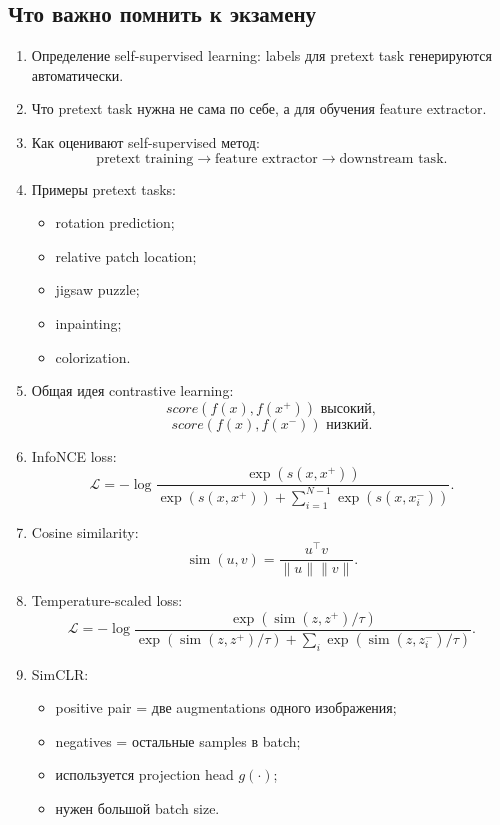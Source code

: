 \documentclass[a4paper,12pt]{article}
\begin{document}
\subsection{Что важно помнить к экзамену}

\begin{enumerate}
    \item Определение self-supervised learning:
    labels для pretext task генерируются автоматически.

    \item Что pretext task нужна не сама по себе, а для обучения feature extractor.

    \item Как оценивают self-supervised метод:
    \[
    \text{pretext training}
    \rightarrow
    \text{feature extractor}
    \rightarrow
    \text{downstream task}.
    \]

    \item Примеры pretext tasks:
    \begin{itemize}
        \item rotation prediction;
        \item relative patch location;
        \item jigsaw puzzle;
        \item inpainting;
        \item colorization.
    \end{itemize}

    \item Общая идея contrastive learning:
    \[
    score(f(x),f(x^+)) \text{ высокий},
    \]
    \[
    score(f(x),f(x^-)) \text{ низкий}.
    \]

    \item InfoNCE loss:
    \[
    \mathcal{L}
    =
    -
    \log
    \frac{
    \exp(s(x,x^+))
    }{
    \exp(s(x,x^+))
    +
    \sum_{i=1}^{N-1}
    \exp(s(x,x_i^-))
    }.
    \]

    \item Cosine similarity:
    \[
    \operatorname{sim}(u,v)
    =
    \frac{u^\top v}{\|u\|\|v\|}.
    \]

    \item Temperature-scaled loss:
    \[
    \mathcal{L}
    =
    -
    \log
    \frac{
    \exp(\operatorname{sim}(z,z^+)/\tau)
    }{
    \exp(\operatorname{sim}(z,z^+)/\tau)
    +
    \sum_i
    \exp(\operatorname{sim}(z,z_i^-)/\tau)
    }.
    \]

    \item SimCLR:
    \begin{itemize}
        \item positive pair = две augmentations одного изображения;
        \item negatives = остальные samples в batch;
        \item используется projection head \(g(\cdot)\);
        \item нужен большой batch size.
    \end{itemize}


\end{enumerate}
\end{document}
